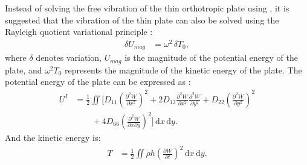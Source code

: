 \documentclass[preprint,12pt]{elsarticle}
\begin{document}
Instead of solving the free vibration of the thin orthotropic plate using , it is suggested that the vibration of the thin plate can also be solved using the Rayleigh quotient variational principle \cite{xing2018overall}:
%
\begin{equation}\label{eq:Rayleigh}
	\begin{split}
		\delta U_{mag} &= \omega^2\,\delta T_0,
	\end{split}
\end{equation}
%
%
where $\delta$ denotes variation, $U_{mag}$ is the magnitude of the potential energy of the plate, and $\omega^2 T_0$ represents the magnitude of the kinetic energy of the plate.
The potential energy of the plate can be expressed as \cite{xing2020extended}:
%
%
\begin{equation}\label{eq:poten_energy}
	\begin{split}
		U^{I} &= \frac{1}{2}\iint \Bigg[D_{11}\left(\frac{\partial^2 W}{\partial x^2}\right)^2 + 2D_{12}\frac{\partial^2 W}{\partial x^2}\frac{\partial^2 W}{\partial y^2} + D_{22}\left(\frac{\partial^2 W}{\partial y^2}\right)^2 \\
		&\qquad + 4D_{66}\left(\frac{\partial^2 W}{\partial x \partial y}\right)^2\Bigg] \, \mathrm{d}x \, \mathrm{d}y.
	\end{split}
\end{equation}
%
And the kinetic energy is:
%
\begin{equation}\label{eq:kine_energy}
	\begin{split}
		T &= \frac{1}{2}\iint \rho h \left(\frac{\partial W}{\partial t}\right)^2 \, \mathrm{d}x \, \mathrm{d}y.
	\end{split}
\end{equation}
\end{document}

